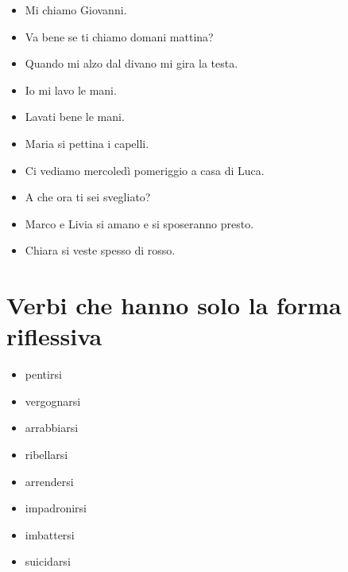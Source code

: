 \documentclass[letter,11pt]{article}
\begin{document}
\begin{multicols}{2}
\begin{itemize}

    \item Mi chiamo Giovanni.
    \item Va bene se ti chiamo domani mattina?
    \item Quando mi alzo dal divano mi gira la testa.
    \item Io mi lavo le mani.
    \item Lavati bene le mani.
    \item Maria si pettina i capelli.
    \item Ci vediamo mercoledì pomeriggio a casa di Luca.
    \item A che ora ti sei svegliato?
    \item Marco e Livia si amano e si sposeranno presto.
    \item Chiara si veste spesso di rosso.


\end{itemize}
\end{multicols}

\vskip 0.2in
\section*{Verbi che hanno solo la forma riflessiva}
\vskip 0.2in

\begin{itemize}
\item pentirsi
\item vergognarsi
\item arrabbiarsi
\item ribellarsi
\item arrendersi
\item impadronirsi
\item imbattersi
\item suicidarsi

\end{itemize}
\end{document}
